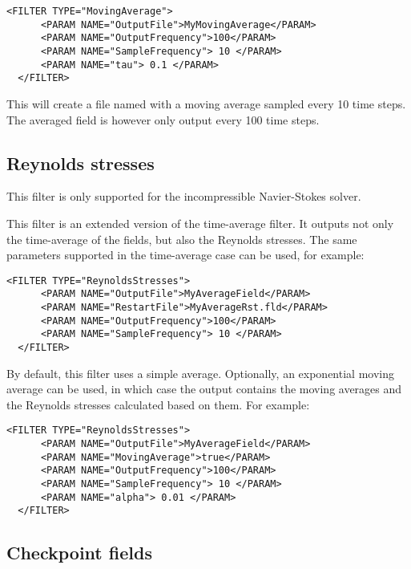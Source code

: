 \begin{lstlisting}[style=XMLStyle,gobble=2]
  <FILTER TYPE="MovingAverage">
      <PARAM NAME="OutputFile">MyMovingAverage</PARAM>
      <PARAM NAME="OutputFrequency">100</PARAM>
      <PARAM NAME="SampleFrequency"> 10 </PARAM>
      <PARAM NAME="tau"> 0.1 </PARAM>
  </FILTER>
\end{lstlisting}

This will create a file named  with a moving average
sampled every 10 time steps. The averaged field is however only
output every 100 time steps.

\subsection{Reynolds stresses}

\begin{notebox}
  This filter is only supported for the incompressible Navier-Stokes solver.
\end{notebox}

This filter is an extended version of the time-average filter. It outputs
not only the time-average of the fields, but also the Reynolds stresses.
The same parameters supported in the time-average case can be used,
for example:

\begin{lstlisting}[style=XMLStyle,gobble=2]
  <FILTER TYPE="ReynoldsStresses">
      <PARAM NAME="OutputFile">MyAverageField</PARAM>
      <PARAM NAME="RestartFile">MyAverageRst.fld</PARAM>
      <PARAM NAME="OutputFrequency">100</PARAM>
      <PARAM NAME="SampleFrequency"> 10 </PARAM>
  </FILTER>
\end{lstlisting}

By default, this filter uses a simple average. Optionally, an exponential
moving average can be used, in which case the output contains the moving
averages and the Reynolds stresses calculated based on them. For example:

\begin{lstlisting}[style=XMLStyle,gobble=2]
  <FILTER TYPE="ReynoldsStresses">
      <PARAM NAME="OutputFile">MyAverageField</PARAM>
      <PARAM NAME="MovingAverage">true</PARAM>
      <PARAM NAME="OutputFrequency">100</PARAM>
      <PARAM NAME="SampleFrequency"> 10 </PARAM>
      <PARAM NAME="alpha"> 0.01 </PARAM>
  </FILTER>
\end{lstlisting}

\subsection{Checkpoint fields}
 
